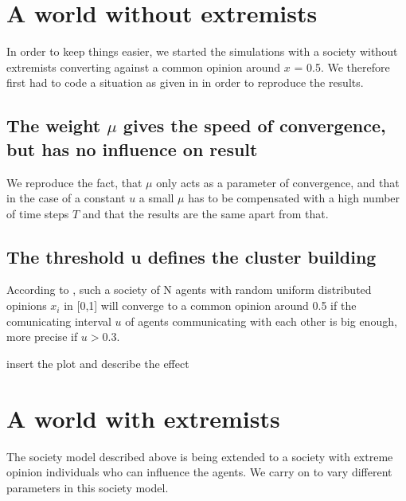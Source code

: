 \documentclass[11pt]{article}
\begin{document}
\section{A world without extremists}
In order to keep things easier, we started the simulations with a society without extremists converting against a common opinion around $x$ = 0.5. We therefore first had to code a situation as given in \cite{Minor} in order to reproduce the results.

\subsection{The weight \texorpdfstring{$\mu$}{TEXT} gives the speed of convergence, but has no influence on result}
We reproduce the fact, that $\mu$ only acts as a parameter of convergence, and that in the case of a constant $u$ a small $\mu$ has to be compensated with a high number of time steps $T$ and that the results are the same apart from that.


\subsection{The threshold u defines the cluster building}
According to \cite{Minor}, such a society of N agents with random uniform distributed opinions $x_i$ in [0,1] will converge to a common opinion around 0.5 if the comunicating interval $u$ of agents communicating with each other is big enough, more precise if $u>0.3$.

insert the plot and describe the effect

\section{A world with extremists}
The society model described above is being extended to a society with extreme opinion individuals who can influence the agents. We carry on to vary different parameters in this society model.
\end{document}
